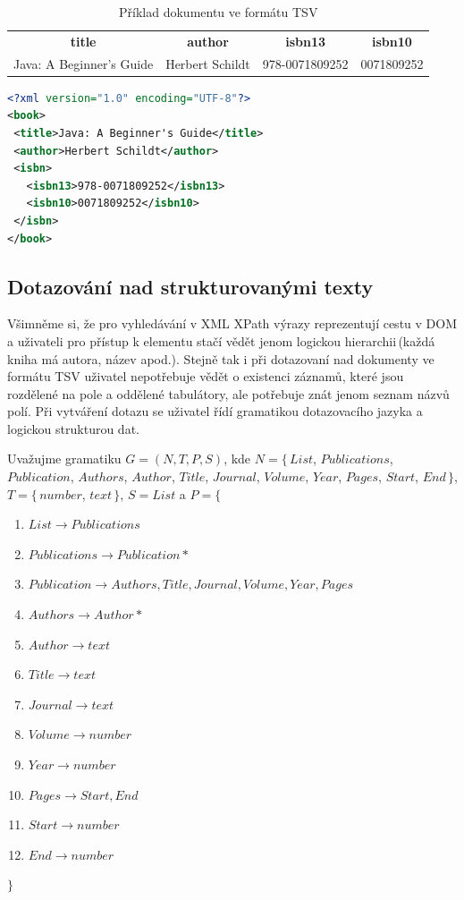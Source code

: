 \begin{table}[H]
\begin{tabular}{c	c	c	c}

\textbf{title} & \textbf{author} & \textbf{isbn13} & \textbf{isbn10} \\

Java: A Beginner's Guide & Herbert Schildt & 978-0071809252 & 0071809252\\

\end{tabular}
\caption{Příklad dokumentu ve formátu TSV}
\label{TSVdoc}
\end{table}

\begin{lstlisting}[language=xml, caption={Příklad dokumentu ve formátu XML}, label={XMLdoc}, captionpos=b]
<?xml version="1.0" encoding="UTF-8"?>
<book>
 <title>Java: A Beginner's Guide</title>
 <author>Herbert Schildt</author>
 <isbn>
   <isbn13>978-0071809252</isbn13>
   <isbn10>0071809252</isbn10>
 </isbn>
</book>
\end{lstlisting}



\subsection{Dotazování nad strukturovanými texty}
\label{queryingStructuredTexts}


Všimněme si, že pro vyhledávání v XML XPath výrazy reprezentují cestu v DOM a uživateli pro přístup k elementu stačí vědět jenom logickou hierarchii\,(každá kniha má autora, název apod.). Stejně tak i při dotazovaní nad dokumenty ve formátu TSV uživatel nepotřebuje vědět o existenci záznamů, které jsou rozdělené na pole a oddělené tabulátory, ale potřebuje znát jenom seznam názvů polí. Při vytváření dotazu se uživatel řídí gramatikou dotazovacího jazyka a logickou strukturou dat. 

Uvažujme gramatiku $G = (N, T, P, S)$, kde $N=\{$\,$List$, $Publications$, $Publication$, $Authors$, $Author$, $Title$, $Journal$, $Volume$, $Year$, $Pages$, $Start$, $End$\,$\}$, $T=\{$\,$number$, $text$\,$\}$, $S = List$ a $P = \{$\,

\begin{enumerate}
\item $ List \rightarrow Publications $
\item $ Publications \rightarrow Publication* $
\item $ Publication \rightarrow Authors, Title, Journal, Volume, Year, Pages $
\item $ Authors \rightarrow Author* $
\item $ Author \rightarrow text $
\item $ Title \rightarrow text $
\item $ Journal \rightarrow text $
\item $ Volume \rightarrow number $
\item $ Year \rightarrow number $
\item $ Pages \rightarrow Start, End $
\item $ Start \rightarrow number $
\item $ End \rightarrow number $
\end{enumerate}
$\}$


